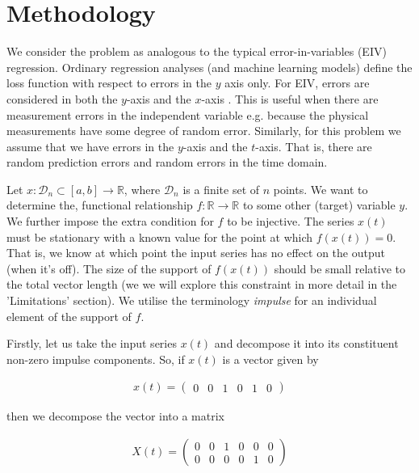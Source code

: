 \documentclass[11pt]{amsart}
\begin{document}
\section{Methodology}

We consider the problem as analogous to the typical error-in-variables (EIV) regression. Ordinary regression analyses (and machine learning models) define the loss function with respect to errors in the $y$ axis only. For EIV, errors are considered in both the $y$-axis and the $x$-axis \cite{deming}. This is useful when there are measurement errors in the independent variable e.g. because the physical measurements have some degree of random error. Similarly, for this problem we assume that we have errors in the $y$-axis and the $t$-axis. That is, there are random prediction errors and random errors in the time domain. 

Let $x: \mathcal{D}_n\subset [a, b] \longrightarrow \mathbb{R}$, where $\mathcal{D}_n$ is a finite set of $n$ points. We want to determine the, functional relationship $f:\mathbb{R} \longrightarrow \mathbb{R}$ to some other (target) variable $y$. We further impose the extra condition for $f$ to be injective.  The series $x(t)$ must be stationary with a known value for the point at which $f(x(t)) = 0$.  That is, we know at which point the input series has no effect on the output (when it’s off). The size of the support of $f(x(t))$ should be small relative to the total vector length (we we will explore this constraint in more detail in the 'Limitations' section). We utilise the terminology {\em impulse} for an individual element of the support of $f$.



Firstly, let us take the input series $x(t)$ and decompose it into its constituent non-zero impulse components. So, if $x(t)$ is a vector given by 

\begin{align}
x(t) = 
\left(
\begin{array}{cccccc}
0 & 0 & 1 & 0 & 1 & 0
\end{array}  
\right)
\end{align}

then we decompose the vector into a matrix 

\begin{align}
X(t) = 
\left(
\begin{array}{cccccc}
0 & 0 & 1 & 0 & 0 & 0 \\
0 & 0 & 0 & 0 & 1 & 0 
\end{array}  
\right)
\end{align}
\end{document}
